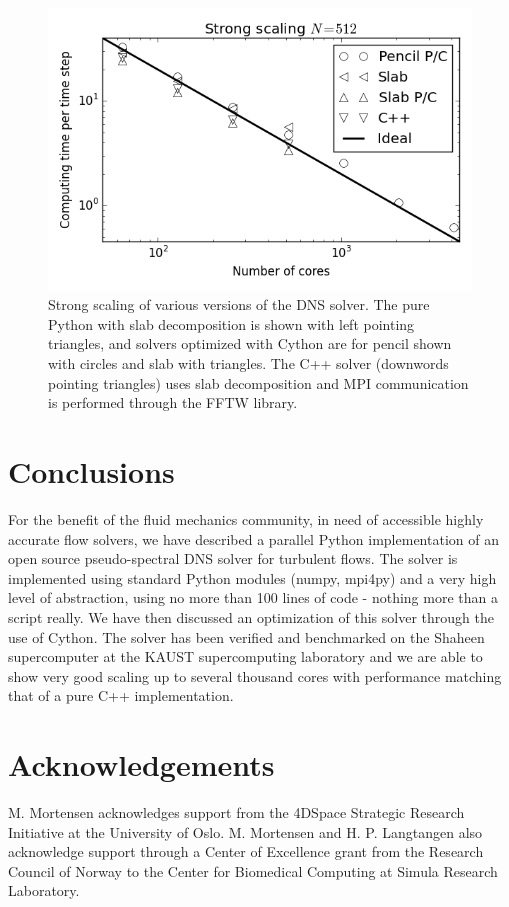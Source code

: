 \documentclass[11pt, oneside]{article}
\begin{document}
\begin{figure}
\includegraphics[scale=1]{figs/strong_scaling_shaheen_512.png}
\caption{Strong scaling of various versions of the DNS solver. The pure Python with slab decomposition is shown with left pointing triangles, and solvers optimized with Cython are for pencil shown with circles and slab with triangles. The C++ solver (downwords pointing triangles) uses slab decomposition and MPI communication is performed through the FFTW library. }
\label{fig:strong_scaling_shaheen}
\end{figure}

\section{Conclusions}

For the benefit of the fluid mechanics community, in need of accessible highly accurate flow solvers, we have described a parallel Python implementation of an open source pseudo-spectral DNS solver for turbulent flows. The solver is implemented using standard Python modules (numpy, mpi4py) and a very high level of abstraction, using no more than 100 lines of code - nothing more than a script really. We have then discussed an optimization of this solver through the use of Cython. The solver has been verified and benchmarked on the Shaheen supercomputer at the KAUST supercomputing laboratory and we are able to show very good scaling up to several thousand cores with performance matching that of a pure C++ implementation. 

\section*{Acknowledgements}
M. Mortensen acknowledges support from the 4DSpace Strategic Research Initiative at the University of Oslo. M. Mortensen and H. P. Langtangen also acknowledge support through a Center of Excellence grant from the Research Council of Norway to the Center for Biomedical Computing at Simula Research Laboratory.
\end{document}

